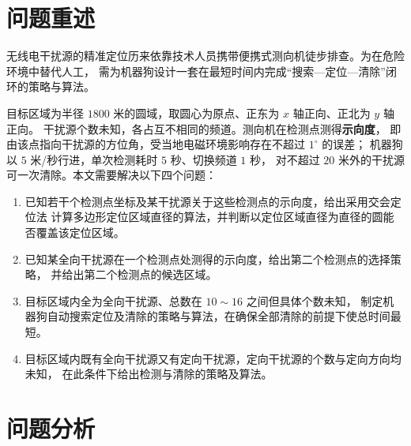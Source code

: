 \documentclass[withoutpreface, bwprint]{cumcmthesis}
\begin{document}
\begin{abstract}
\textbf{创新之处}：(i) 证明问题二的常规提法不适定并改用期望总清除时间为准则；
(ii) 把停止准则化为圆覆盖与半平面围堵问题，使“确保清除”由\textbf{证明}而非高清除率支撑；
(iii) 交会角—收信概率恒等式，定量刻画定向条件下定位精度与收信把握的冲突。

\end{abstract}


\section{问题重述}

无线电干扰源的精准定位历来依靠技术人员携带便携式测向机徒步排查。为在危险环境中替代人工，
需为机器狗设计一套在最短时间内完成“搜索—定位—清除”闭环的策略与算法。

目标区域为半径 $1800$ 米的圆域，取圆心为原点、正东为 $x$ 轴正向、正北为 $y$ 轴正向。
干扰源个数未知，各占互不相同的频道。测向机在检测点测得\textbf{示向度}，
即由该点指向干扰源的方位角，受当地电磁环境影响存在不超过 $1^\circ$ 的误差；
机器狗以 $5$ 米/秒行进，单次检测耗时 $5$ 秒、切换频道 $1$ 秒，
对不超过 $20$ 米外的干扰源可一次清除。本文需要解决以下四个问题：

\begin{enumerate}[label=(\arabic*)]
  \item 已知若干个检测点坐标及某干扰源关于这些检测点的示向度，给出采用交会定位法
        计算多边形定位区域直径的算法，并判断以定位区域直径为直径的圆能否覆盖该定位区域。
  \item 已知某全向干扰源在一个检测点处测得的示向度，给出第二个检测点的选择策略，
        并给出第二个检测点的候选区域。
  \item 目标区域内全为全向干扰源、总数在 $10\sim16$ 之间但具体个数未知，
        制定机器狗自动搜索定位及清除的策略与算法，在确保全部清除的前提下使总时间最短。
  \item 目标区域内既有全向干扰源又有定向干扰源，定向干扰源的个数与定向方向均未知，
        在此条件下给出检测与清除的策略及算法。
\end{enumerate}

\section{问题分析}
\end{document}
